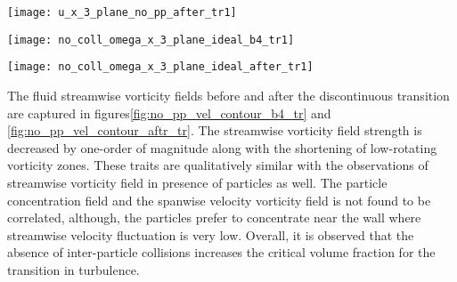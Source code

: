 \documentclass[aip,graphicx]{revtex4-1}
\begin{document}
\begin{figure*}[!h]
\centering
\texttt{[image: u\_x\_3\_plane\_no\_pp\_after\_tr1]}
	\caption{Contours of streamwise velocity fluctuations of fluid phase laden with particles of volume fraction $\phi=9.625X10^{-4}$ showed in three different planes as shown in the figures in absence of inter-particle collision} 
	\label{fig:no_pp_vel_contour_aftr_tr}
\end{figure*}
\begin{figure*}[!h]
\centering
\texttt{[image: no\_coll\_omega\_x\_3\_plane\_ideal\_b4\_tr1]}
	\caption{Contours of streamwise vorticity fluctuations of fluid phase laden with particles of volume fraction $\phi_{cr}=8.75X10^{-4}$ showed in three different planes as shown in the figures in absence of inter-particle collision} 
	\label{fig:no_pp_vort_contour_b4_tr}
\end{figure*}
\begin{figure*}[!h]
\centering
\texttt{[image: no\_coll\_omega\_x\_3\_plane\_ideal\_after\_tr1]}
	\caption{Contours of streamwise vorticity fluctuations of fluid phase laden with particles of volume fraction $\phi=9.625X10^{-4}$ showed in three different planes as shown in the figures in absence of inter-particle collision} 
	\label{fig:no_pp_vort_contour_aftr_tr}
\end{figure*}
The fluid streamwise vorticity fields before and after the discontinuous transition are captured in figures\ref{fig:no_pp_vel_contour_b4_tr} and \ref{fig:no_pp_vel_contour_aftr_tr}.
 The streamwise vorticity field strength is decreased by one-order of magnitude along with the shortening of low-rotating vorticity zones. These traits are qualitatively similar with the observations of streamwise vorticity field in presence of particles as well. The particle concentration field and the spanwise velocity vorticity field is not found to be correlated, although, the particles prefer to concentrate near the wall where streamwise velocity fluctuation is very low. Overall, it is observed that the absence of inter-particle collisions increases the critical volume fraction for the transition in turbulence.
\end{document}
